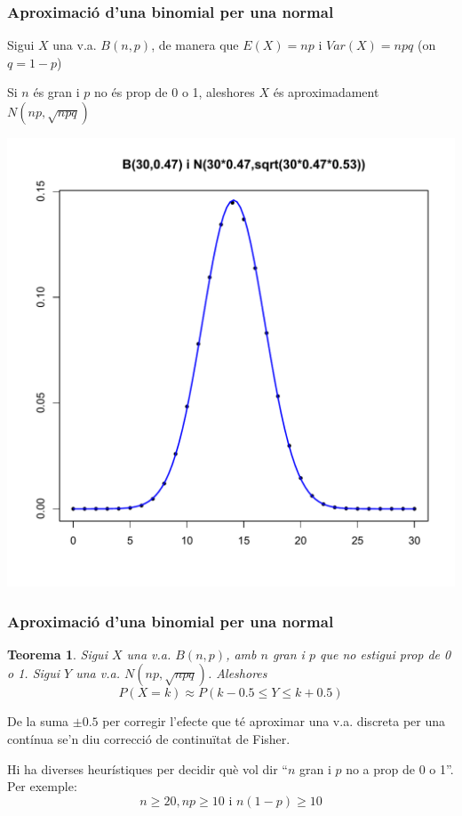 \documentclass[12pt,t]{beamer}\usepackage[]{graphicx}\usepackage[]{color}
\renewcommand{\emph}[1]{{\color{red}#1}}
\renewcommand{\leq}{\leqslant}
\renewcommand{\geq}{\geqslant}
\theoremstyle{plain}
\newtheorem{teorema}{Teorema}
\theoremstyle{definition}
\begin{document}
\begin{frame}
\frametitle{Aproximació d'una binomial per una normal}
\vspace*{-1ex}

Sigui  $X$ una v.a. $B(n,p)$, de manera  que $E(X)=np$  i
$Var(X)=npq$ (on $q=1-p$)
\medskip

Si $n$ és gran i $p$ no és prop de 0 o 1, aleshores $X$ és aproximadament $N(np,\sqrt{npq})$
\vspace*{-1ex}

\begin{center}
\includegraphics[width=0.58\linewidth]{normvsbin}
\end{center}


\end{frame}


\begin{frame}
\frametitle{Aproximació d'una binomial per una normal}
\vspace*{-2ex}

\begin{teorema}
Sigui  $X$ una v.a. $B(n,p)$, amb $n$ gran i $p$ que no estigui prop de 0 o 1. Sigui $Y$ una v.a. $N(np,\sqrt{npq})$. Aleshores 
$$
P(X=k)\approx  P\left(k-0.5\leq Y\leq k+0.5\right)
$$
\end{teorema}
De la suma $\pm 0.5$ per corregir l'efecte que té aproximar una v.a. discreta per una contínua se'n diu \emph{correcció de continuïtat de Fisher}.
\medskip

Hi ha diverses heurístiques per decidir què vol dir ``$n$ gran i $p$ no a prop de 0 o 1''. Per exemple: $$n\geq 20, np\geq 10\mbox{ i }n(1-p)\geq 10$$

\end{frame}
\end{document}
